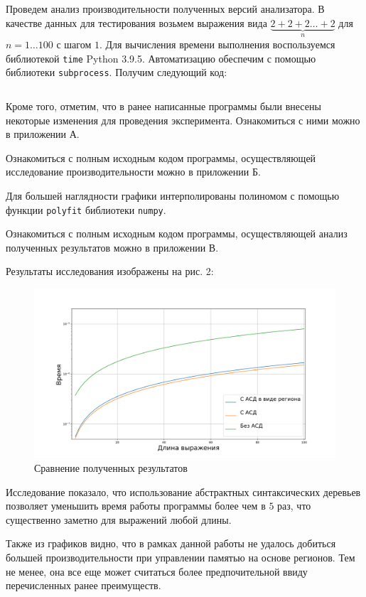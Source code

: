 Проведем анализ производительности полученных версий анализатора. В качестве
данных для тестирования возьмем выражения вида $\underbrace{2 + 2 + 2 \dots +
2}_{n}$ для $n = 1\dots100$ с шагом $1$. Для вычисления времени выполнения
воспользуемся библиотекой \verb|time| Python 3.9.5. Автоматизацию обеспечим с
помощью библиотеки \verb|subprocess|. Получим следующий код:

\inputminted{python}{test.py}

Кроме того, отметим, что в ранее написанные программы были внесены некоторые
изменения для проведения эксперимента. Ознакомиться с ними можно в приложении А.

Ознакомиться с полным исходным кодом программы, осуществляющей исследование
производительности можно в приложении Б.

Для большей наглядности графики интерполированы полиномом с помощью функции
\verb|polyfit| библиотеки \verb|numpy|.

Ознакомиться с полным исходным кодом программы, осуществляющей анализ полученных
результатов можно в приложении В.

Результаты исследования изображены на рис. 2:

\begin{figure}[hbt!]
    \centering
    \includegraphics[scale=0.5]{benchmark.png}
    \caption{Сравнение полученных результатов}
    \label{fig:benchmark}
\end{figure}

Исследование показало, что использование абстрактных синтаксических деревьев
позволяет уменьшить время работы программы более чем в $5$ раз, что существенно
заметно для выражений любой длины.

Также из графиков видно, что в рамках данной работы не удалось добиться большей
производительности при управлении памятью на основе регионов. Тем не менее, она
все еще может считаться более предпочительной ввиду перечисленных ранее
преимуществ.